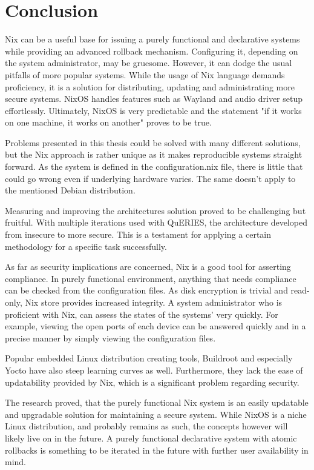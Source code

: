 \chapter{Conclusion} \label{conclusion}

Nix can be a useful base for issuing a purely functional and
declarative systems while providing an advanced rollback
mechanism. Configuring it, depending on the system administrator, may
be gruesome. However, it can dodge the usual pitfalls of more popular
systems. While the usage of Nix language demands proficiency, it is a
solution for distributing, updating and administrating more secure
systems. NixOS handles features such as Wayland and audio driver setup
effortlessly. Ultimately, NixOS is very predictable and the statement
"if it works on one machine, it works on another" proves to be true.

Problems presented in this thesis could be solved with many different solutions,
but the Nix approach is rather unique as it makes reproducible systems straight forward. As the system is defined in the
configuration.nix file, there is little that could go wrong even if 
underlying hardware varies. The same doesn't apply to the mentioned
Debian distribution.

Measuring and improving the architectures solution proved to be
challenging but fruitful. With multiple iterations used with QuERIES,
the architecture developed from insecure to more secure. This is a
testament for applying a certain methodology for a
specific task successfully.

As far as security implications are concerned, Nix is a good tool for
asserting compliance. In purely functional environment, anything that
needs compliance can be checked from the configuration files. As disk
encryption is trivial and read-only, Nix store provides increased
integrity. A system administrator who is proficient with Nix, can
assess the states of the systems' very quickly. For example, viewing
the open ports of each device can be answered quickly and in a precise
manner by simply viewing the configuration files.

Popular embedded Linux distribution creating tools,
Buildroot and especially Yocto have also steep learning curves as well. Furthermore, they
lack the ease of updatability provided by Nix, which is a
significant problem regarding security.

The research proved, that the purely functional Nix system is an
easily updatable and upgradable solution for maintaining a secure
system.  While NixOS is a niche Linux distribution, and probably
remains as such, the concepts however will likely live on in the
future. A purely functional declarative system with atomic rollbacks
is something to be iterated in the future with further user
availability in mind.
